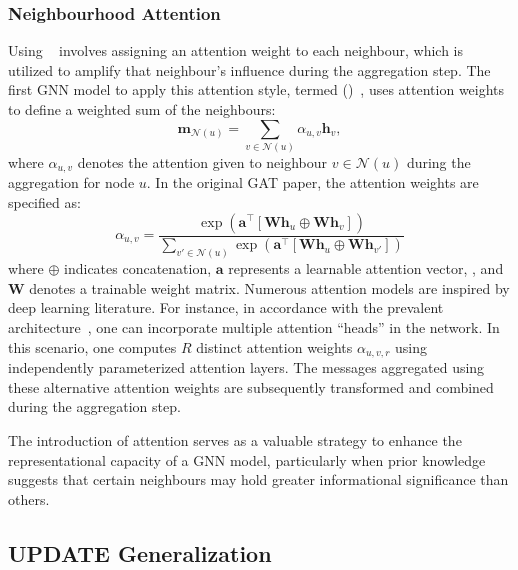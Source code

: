 \subsubsection{Neighbourhood Attention}
Using ~\cite{Vaswani2017attentionIsAllYouNeed} involves assigning an attention weight to each neighbour, which is utilized to amplify that neighbour's influence during the aggregation step. The first GNN model to apply this attention style, termed  ()~\cite{Velivckovic2017graphAttentionNetworks}, uses attention weights to define a weighted sum of the neighbours:
\begin{equation*}
    \mathbf{m}_{\mathcal{N}(u)} = \sum_{v\in\mathcal{N}(u)} \alpha_{u,v}\mathbf{h}_v,
\end{equation*}
where $ \alpha_{u,v} $ denotes the attention given to neighbour $ v \in \mathcal{N}(u) $ during the aggregation for node $ u $. In the original GAT paper, the attention weights are specified as:
\begin{equation*}
    \alpha_{u,v} = \frac{\exp(\mathbf{a}^\top[\mathbf{W}\mathbf{h}_u \oplus \mathbf{W}\mathbf{h}_v])}{\sum_{v'\in\mathcal{N}(u)} \exp(\mathbf{a}^\top[\mathbf{W}\mathbf{h}_u \oplus \mathbf{W}\mathbf{h}_{v'}])}
\end{equation*}
where $ \oplus $ indicates concatenation, $ \mathbf{a} $ represents a learnable attention vector, , and $ \mathbf{W} $ denotes a trainable weight matrix.
Numerous attention models are inspired by deep learning literature. For instance, in accordance with the prevalent  architecture~\cite{Vaswani2017attentionIsAllYouNeed}, one can incorporate multiple attention ``heads'' in the network. In this scenario, one computes $ R $ distinct attention weights $ \alpha_{u,v,r} $ using independently parameterized attention layers. The messages aggregated using these alternative attention weights are subsequently transformed and combined during the aggregation step.

\medskip
The introduction of attention serves as a valuable strategy to enhance the representational capacity of a GNN model, particularly when prior knowledge suggests that certain neighbours may hold greater informational significance than others.

\subsection{UPDATE Generalization}

